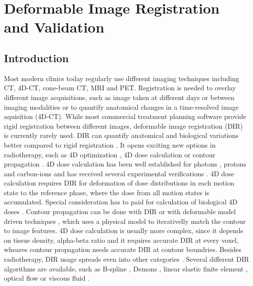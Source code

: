 \chapter{Deformable Image Registration and Validation}
\label{chapter:vmm}
\minitoc

\section{Introduction}


Most modern clinics today regularly use different imaging techniques including CT, 4D-CT, cone-beam CT, MRI and PET. Registration is needed to overlay different image acquisitions, such as image taken at different days or between imaging modalities or to quantify anatomical changes in a time-resolved image aquisition (4D-CT). While most commercial treatment planning software provide rigid registration between different images, deformable image registration (DIR) is currently rarely used. 
DIR can quantify anatomical and biological variations better compared to rigid registration \cite{Sarrut2006}. It opens exciting new options in radiotherapy, such as 4D optimization \cite{Trofimov2005}, 
4D dose calculation \cite{Flampouri2006} or contour propagation \cite{Lu2006b}. 4D dose calculation has been well established for photons \cite{Ong2016}, protons \cite{Paganetti2005} and carbon-ions \cite{Gemmel2011} and has received
several experimental verifications \cite{Vinogradskiy2009, Perrin2016, Bert2012a}. 4D dose calculation requires DIR for deformation of dose distributions in each motion state
to the reference phase, where the dose from all motion states is accumulated. Special consideration has to paid for calculation of biological 4D doses \cite{Gemmel2011}. Contour propagation can be done with DIR \cite{Lu2006a, Rietzel2005a} or
with deformable model driven techniques \cite{McInerney1996, Montagnat2005}, which uses a physical model to iterativelly match the contour to image features. 4D dose calculation is usually more complex, since it depends on tissue density,
alpha-beta ratio and it requires accurate DIR at every voxel, wheares contour propagation needs accurate DIR at contour boundries.
Besides radiotherapy, DIR usage spreads even into other categories \cite{Cleary2010, Herrell2012, Nithiananthan2011, Naini2010}.
Several different DIR algorithms are available, such as B-spline \cite{Rueckert1999}, Demons \cite{Thirion1998}, linear elastic finite element \cite{Venugopal2005}, optical flow \cite{Zhong2007} or viscous fluid \cite{Christensen1996}.
	
